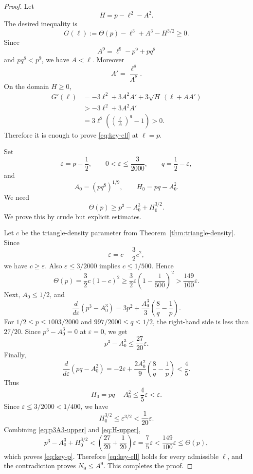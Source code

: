 \documentclass[11pt]{article}
\newcommand{\eps}{\varepsilon}
\begin{document}
\begin{proof}
Let
\[
        H=p-\ell^2-A^2.
\]
The desired inequality is
\[
        G(\ell):=\Theta(p)-\ell^3+A^3-H^{3/2}\ge0.
\]
Since
\[
        A^9=\ell^9-p^9+pq^8
\]
and $pq^8<p^9$, we have $A<\ell$.  Moreover
\[
        A'=\frac{\ell^8}{A^8}.
\]
On the domain $H\ge0$,
\[
\begin{aligned}
        G'(\ell)
        &=-3\ell^2+3A^2A'
          +3\sqrt H\, (\ell+AA') \\
        &> -3\ell^2+3A^2A' \\
        &=3\ell^2\left(\left(\frac{\ell}{A}\right)^6-1\right)>0.
\end{aligned}
\]
Therefore it is enough to prove \eqref{eq:key-ell} at $\ell=p$.

Set
\[
        \eps=p-\frac12,
        \qquad 0<\eps\le\frac{3}{2000},
        \qquad q=\frac12-\eps,
\]
and
\[
        A_0=(pq^8)^{1/9},
        \qquad H_0=pq-A_0^2.
\]
We need
\begin{equation}\label{eq:key-p}
        \Theta(p)\ge p^3-A_0^3+H_0^{3/2}.
\end{equation}
We prove this by crude but explicit estimates.

Let $c$ be the triangle-density parameter from Theorem~\ref{thm:triangle-density}.  Since
\[
        \eps=c-\frac32c^2,
\]
we have $c\ge\eps$.  Also $\eps\le3/2000$ implies $c\le1/500$.  Hence
\begin{equation}\label{eq:theta-lower}
        \Theta(p)=\frac32c(1-c)^2
        \ge \frac32\eps\left(1-\frac1{500}\right)^2
        >\frac{149}{100}\eps.
\end{equation}
Next, $A_0\le1/2$, and
\[
        \frac{d}{d\eps}(p^3-A_0^3)
        =3p^2+\frac{A_0^3}{3}\left(\frac8q-\frac1p\right).
\]
For $1/2\le p\le1003/2000$ and $997/2000\le q\le1/2$, the right-hand side is less than $27/20$.  Since $p^3-A_0^3=0$ at $\eps=0$, we get
\begin{equation}\label{eq:p3A3-upper}
        p^3-A_0^3\le \frac{27}{20}\eps.
\end{equation}
Finally,
\[
        \frac{d}{d\eps}(pq-A_0^2)
        =-2\eps+\frac{2A_0^2}{9}\left(\frac8q-\frac1p\right)<\frac45.
\]
Thus
\[
        H_0=pq-A_0^2\le\frac45\eps<\eps.
\]
Since $\eps\le3/2000<1/400$, we have
\begin{equation}\label{eq:H-upper}
        H_0^{3/2}\le \eps^{3/2}<\frac1{20}\eps.
\end{equation}
Combining \eqref{eq:p3A3-upper} and \eqref{eq:H-upper},
\[
        p^3-A_0^3+H_0^{3/2}
        <\left(\frac{27}{20}+\frac1{20}\right)\eps
        =\frac75\eps
        <\frac{149}{100}\eps
        \le\Theta(p),
\]
which proves \eqref{eq:key-p}.  Therefore \eqref{eq:key-ell} holds for every admissible $\ell$, and the contradiction proves $N_9\le A^9$.  This completes the proof.
\end{proof}
\end{document}
